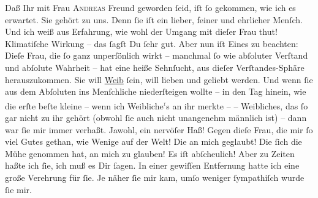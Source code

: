 \pstart
           Daß Ihr mit Frau \textsc{Andreas} Freund geworden{ }ſeid, iſt{ }ſo gekommen, wie ich es erwartet. Sie gehört zu uns.
               Denn{ }ſie iſt ein lieber, feiner und ehrlicher Menſch. Und ich weiß aus Erfahrung, wie wohl der Umgang mit
               dieſer Frau thut!
               Klimatiſche Wirkung – das{ }ſagſt Du{ }ſehr gut. Aber nun iſt Eines zu beachten: {\pb}Dieſe Frau, die{ }ſo ganz unperſönlich wirkt – manchmal{ }ſo wie
               abſoluter Verſtand und abſolute Wahrheit – hat eine heiße Sehnſucht, aus dieſer
               Verſtandes-Sphäre herauszukommen. Sie will \uline{Weib}{ }ſein,
               will lieben und geliebt werden. Und wenn{ }ſie aus dem Abſoluten ins Menſchliche
               niederſteigen wollte – in den Tag hinein, wie  die
               erſte beſte kleine {\pb}\label{K_L02735-6v}\label{K_L02735-6} – wenn ich Weibliche\substVorne{}\textsuperscript{\textcolor{gray}{r}}\substDazwischen{}s\substHinten{} an ihr merkte – \label{K_L02735-7v}\label{K_L02735-7} – Weibliches, das{ }ſo gar nicht zu ihr gehört (obwohl{ }ſie
               auch nicht unangenehm männlich ist) – dann war{ }ſie 
               mir immer verhaßt. Jawohl, ein nervöſer Haß! Gegen dieſe Frau, die mir{ }ſo viel Gutes gethan, wie
               Wenige auf  der Welt! Die an mich geglaubt! Die{ }ſich
               die Mühe genommen hat, an {\pb}mich zu glauben! Es iſt
               abſcheulich! Aber zu Zeiten haßte ich{ }ſie, ich muß es Dir{ }ſagen. In einer gewiſſen
               Entfernung  hatte ich eine große Verehrung für{ }ſie. Je näher{ }ſie mir kam, umſo weniger{ }ſympathiſch wurde{ }ſie mir.\pend
           
